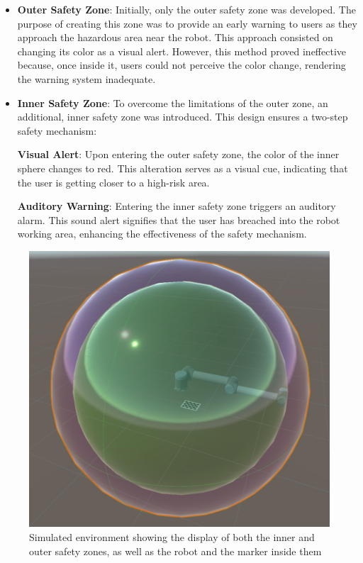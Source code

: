         \begin{itemize}
            \item \textbf{Outer Safety Zone}: Initially, only the outer safety zone was developed. The purpose of creating this zone was to provide an 
            early warning to users as they approach the hazardous area near the robot. This approach consisted on changing its color as a visual alert. 
            However, this method proved ineffective because, once inside it, users could not perceive the color change, rendering the warning system inadequate.
            
            \item \textbf{Inner Safety Zone}: To overcome the limitations of the outer zone, an additional, inner safety zone was introduced. 
            This design ensures a two-step safety mechanism:

                \textbf{Visual Alert}: Upon entering the outer safety zone, the color of the inner sphere changes to red. 
                This alteration serves as a visual cue, indicating that the user is getting closer to a high-risk area.

                \textbf{Auditory Warning}: Entering the inner safety zone triggers an auditory alarm. This sound alert signifies that the user has 
                breached into the robot working area, enhancing the effectiveness of the safety mechanism.
        \end{itemize}

        \begin{figure}[h]
            \centering
            \includegraphics[width=0.5\linewidth]{figs/dual-safetyzone-robot.png}
            \caption{Simulated environment showing the display of both the inner and outer safety zones, as well as the robot and the marker inside them}
            \label{fig:dual-safety}
        \end{figure}

